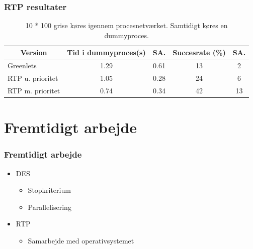 \documentclass[12pt]{beamer}
\newcommand\mc[1]{\multicolumn{1}{c}{\textbf {#1}}} %
\begin{document}
\begin{frame}
  	\frametitle{RTP resultater}
	\tiny 
	\begin{table}[htbp]
		\centering
		\begin{tabular}{lcccc}
		   	\toprule
		    \mc{Version}&\mc{Tid i dummyproces(s)}&\mc{SA.}& \mc{Succesrate (\%)}&\mc{SA.}\\
		    \midrule
		    Greenlets         & 1.29 & 0.61 & 13 & 2  \\
		    RTP u. prioritet  & 1.05 & 0.28 & 24 & 6  \\
		    RTP m. prioritet  & 0.74 & 0.34 & 42 & 13 \\
		    \bottomrule
		\end{tabular}
		\caption[]{\tiny 10 * 100 grise køres igennem procesnetværket. Samtidigt køres en dummyproces.}
	\end{table}
\end{frame} 

\section{Fremtidigt arbejde}
\begin{frame}
  	\frametitle{Fremtidigt arbejde}
\begin{itemize}
\item DES
	\begin{itemize}
	\item Stopkriterium
	\item Parallelisering
	\end{itemize}
\item RTP
	\begin{itemize}
	\item Samarbejde med operativsystemet
	\end{itemize}
\end{itemize}
\end{frame}
 
\end{document}
